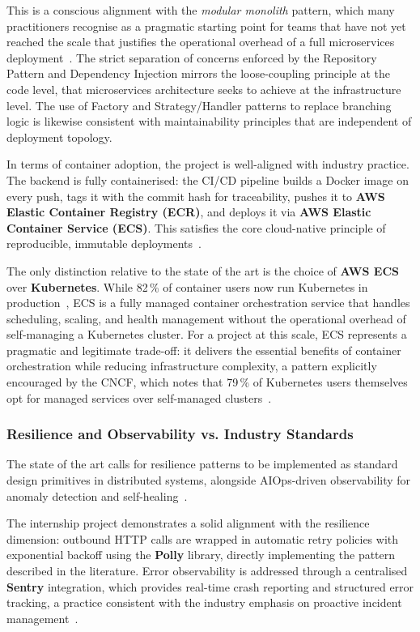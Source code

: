 This is a conscious alignment with the \textit{modular monolith}
pattern, which many practitioners recognise as a pragmatic
starting point for teams that have not yet reached the scale that
justifies the operational overhead of a full microservices
deployment~\cite{ini8labs2025}.
The strict separation of concerns enforced by the Repository Pattern
and Dependency Injection mirrors the loose-coupling principle at the code level, that microservices architecture seeks to achieve at the infrastructure level.
The use of Factory and Strategy/Handler patterns to replace branching
logic is likewise consistent with maintainability principles that are
independent of deployment topology.
 
In terms of container adoption, the project is well-aligned with
industry practice. The backend is fully containerised: the CI/CD
pipeline builds a Docker image on every push, tags it with the
commit hash for traceability, pushes it to \textbf{AWS Elastic
Container Registry (ECR)}, and deploys it via \textbf{AWS Elastic
Container Service (ECS)}. This satisfies the core cloud-native
principle of reproducible, immutable deployments~\cite{cncf2026survey}.
 
The only distinction relative to the state of the art is the choice
of \textbf{AWS ECS} over \textbf{Kubernetes}. While 82\,\% of
container users now run Kubernetes in production~\cite{cncf2026survey},
ECS is a fully managed container orchestration service that handles
scheduling, scaling, and health management without the operational
overhead of self-managing a Kubernetes cluster. For a project at this
scale, ECS represents a pragmatic and legitimate trade-off: it
delivers the essential benefits of container orchestration while
reducing infrastructure complexity, a pattern explicitly encouraged
by the CNCF, which notes that 79\,\% of Kubernetes users themselves
opt for managed services over self-managed
clusters~\cite{cncf2026survey}.
 
 
\subsubsection{Resilience and Observability vs. Industry
Standards}\label{subsub:contrast:resilience}
 
The state of the art calls for resilience patterns to be implemented
as standard design primitives in distributed systems, alongside
AIOps-driven observability for anomaly detection and
self-healing~\cite{madrigan2025,devopsdotcom2025}.
 
The internship project demonstrates a solid alignment with the
resilience dimension: outbound HTTP calls are wrapped in automatic
retry policies with exponential backoff using the \textbf{Polly}
library, directly implementing the pattern described in the
literature. Error observability is addressed through a centralised
\textbf{Sentry} integration, which provides real-time crash
reporting and structured error tracking, a practice consistent with
the industry emphasis on proactive incident
management~\cite{devopsdotcom2025}.
 
